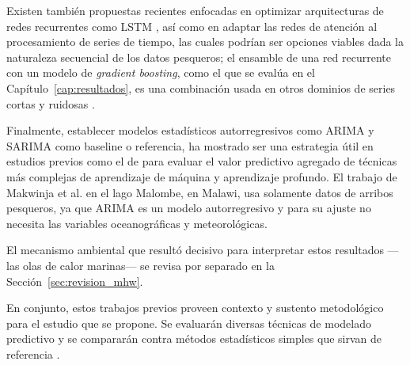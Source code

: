Existen también propuestas recientes enfocadas en optimizar arquitecturas de redes recurrentes como LSTM \citep{greff2017,lindemann2021}, así como en adaptar las redes de atención \citep{vaswani2023} al procesamiento de series de tiempo, las cuales podrían ser opciones viables dada la naturaleza secuencial de los datos pesqueros; el ensamble de una red recurrente con un modelo de \emph{gradient boosting}, como el que se evalúa en el Capítulo~\ref{cap:resultados}, es una combinación usada en otros dominios de series cortas y ruidosas \citep{shi2022}.


Finalmente, establecer modelos estadísticos autorregresivos como ARIMA y SARIMA como baseline o referencia, ha mostrado ser una estrategia útil en estudios previos como el de \citet{makwinja2021} para evaluar el valor predictivo agregado de técnicas más complejas de aprendizaje de máquina y aprendizaje profundo. El trabajo de Makwinja et al. en el lago Malombe, en Malawi, usa solamente datos de arribos pesqueros, ya que ARIMA es un modelo autorregresivo y para su ajuste no necesita las variables oceanográficas y meteorológicas.


El mecanismo ambiental que resultó decisivo para interpretar estos resultados ---las olas de calor marinas--- se revisa por separado en la Sección~\ref{sec:revision_mhw}.

En conjunto, estos trabajos previos proveen contexto y sustento metodológico para el estudio que se propone. Se evaluarán diversas técnicas de modelado predictivo y se compararán contra métodos estadísticos simples que sirvan de referencia \citep{ho1999,hyndman2021}.
